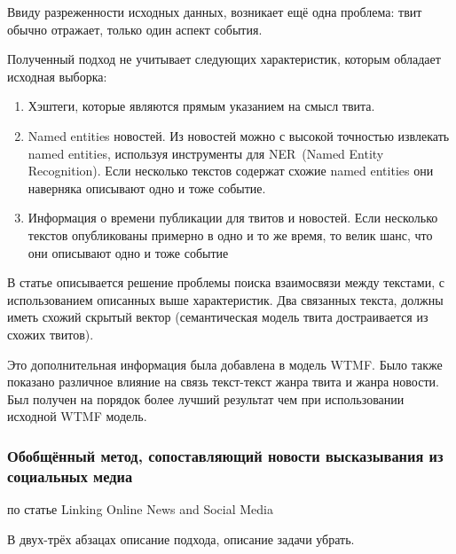             Ввиду разреженности исходных данных, возникает ещё одна проблема: твит обычно отражает, только один аспект события.

            Полученный подход не учитывает следующих характеристик, которым обладает исходная выборка:
            \begin{enumerate}
                \item Хэштеги, которые являются прямым указанием на смысл твита.
                \item {\color{red} Named entities} новостей. Из новостей можно с высокой точностью извлекать {\color{red} named entities}, используя инструменты для NER~(Named Entity Recognition). Если несколько текстов содержат схожие {\color{red} named entities} они наверняка описывают одно и тоже событие.
                \item Информация о времени публикации для твитов и новостей. Если несколько текстов опубликованы примерно в одно и то же время, то велик шанс, что они описывают одно и тоже событие
            \end{enumerate}
            В статье описывается решение проблемы поиска взаимосвязи между текстами, с использованием описанных выше характеристик. Два связанных текста, должны иметь схожий скрытый вектор (семантическая модель твита достраивается из схожих твитов).

            Это дополнительная информация была добавлена в модель WTMF. Было также показано различное влияние на связь текст-текст жанра твита и жанра новости. Был получен на порядок более лучший результат чем при использовании исходной WTMF модель.

    \subsubsection{Обобщённый метод, сопоставляющий новости высказывания из социальных медиа}
        по статье Linking Online News and Social Media

        В двух-трёх абзацах описание подхода, описание задачи убрать.

